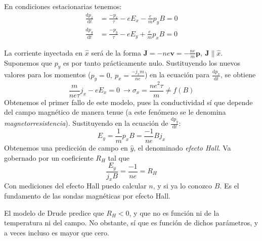 En condiciones estacionarias tenemos:
\begin{equation}
\begin{split}
  \frac{\text{d}p_x}{\text{d}t} &= \frac{-p_x}{\tau}-e E_x -
                                  \frac{e}{m}p_y B = 0 \\
  \frac{\text{d}p_y}{\text{d}t} &= \frac{-p_y}{\tau}-e E_y +
                                  \frac{e}{m}p_x B = 0
\end{split}
\end{equation}

La corriente inyectada en $\hat x$ será de la forma $\mathbf{J} = - n
e \mathbf{v} = - \frac{ne}{m} \mathbf{p}, \ \mathbf{J} \parallel \hat x$.
Suponemos que $p_y$ es por tanto prácticamente nulo. Sustituyendo los
nuevos valores para los momentos ($p_y = 0, \ p_x = \frac{-j_x
  m}{ne}$) en la ecuación para $\frac{\text{d}p_x}{\text{d}t}$, se obtiene
\begin{equation}
  \frac{m}{ne\tau}j_x - eE_x = 0 \ \rightarrow \sigma_x =
  \frac{ne^2\tau}{m} \neq f(B)
\end{equation}
Obtenemos el primer fallo de este modelo, pues la conductividad sí que
depende del campo magnético de manera tenue (a este fenómeno se le
denomina \emph{magnetorresistencia}). Sustituyendo en la
ecuación de $\frac{\text{d}p_y}{\text{d}t}$:
\begin{equation}
  E_y = \frac{1}{m}p_x B = \frac{-1}{ne}Bj_x
\end{equation}
Obtenemos una predicción de campo en $\hat y$, el denominado
\emph{efecto Hall}. Va gobernado por un coeficiente $R_H$ tal que
\begin{equation}
  \frac{E_y}{j_x B} = \frac{-1}{ne} = R_H
\end{equation}
Con mediciones del efecto Hall puedo calcular $n$, y si ya lo conozco
$B$. Es el fundamento de las sondas magnéticas por efecto Hall.

El modelo de Drude predice que $R_H < 0$, y que no es función ni de la
temperatura ni del campo. No obstante, sí que es función de dichos
parámetros, y a veces incluso es mayor que cero.

